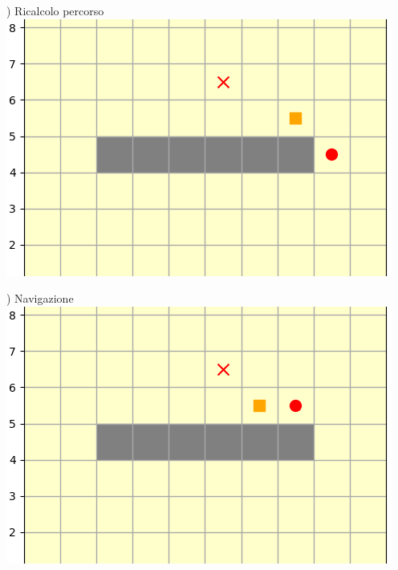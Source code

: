 \documentclass[12pt]{article}
\begin{document}
\noindent \begin{minipage}[ht]{0.45\linewidth}
) Ricalcolo percorso
\includegraphics[width=\textwidth]{SimulazioniNavigazione/1AGV_Walls/2.png}
\end{minipage}
\begin{minipage}[ht]{0.45\linewidth}
) Navigazione
\includegraphics[width=\textwidth]{SimulazioniNavigazione/1AGV_Walls/3.png}
\end{minipage}\\

\vspace{1cm}
\end{document}
